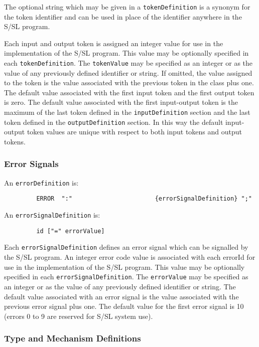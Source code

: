 The optional string which may be given in a {\tt tokenDefinition}
is  a synonym for the token identifier and can be used
in place of the identifier anywhere in the S/SL program.

Each input and output token is assigned an integer  value
for  use  in  the  implementation of the S/SL program.  This
value may be optionally specified in  each  {\tt tokenDefinition}.
The {\tt tokenValue} may  be  specified  as an integer or as the
value of any previously defined identifier  or  string.   If
omitted,  the value assigned to the token is the value associated with 
the previous token in the class plus one. The
default  value associated with the first input token and the
first output token is zero.  The  default  value  associated
with the first input-output token is the maximum of the last
token defined in the {\tt inputDefinition} section  and  the    last
token  defined in the {\tt outputDefinition} section.    In this way
the  default  input-output  token  values  are  unique  with
respect to both input tokens and output tokens.




\subsubsection{Error Signals}

An {\tt errorDefinition} is:
\begin{verbatim}
         ERROR  ":"                       {errorSignalDefinition} ";"
\end{verbatim}

An {\tt errorSignalDefinition} is:
\begin{verbatim}
         id ["=" errorValue]
\end{verbatim}

Each {\tt errorSignalDefinition} defines an error signal  which
can be signalled by the S/SL program.  An integer error code
value is associated with each errorId for use in the  
implementation of the S/SL program.     This value may be optionally
specified in each {\tt errorSignalDefinition}.  The {\tt errorValue} may
be specified as an integer or as the value of any previously
defined identifier or string.  The default value  associated
with an error signal is the value associated with the 
previous error signal plus one.  The default value for the  first
error signal is 10 (errors 0 to 9 are reserved for S/SL system use).




\subsubsection{Type and Mechanism Definitions}

